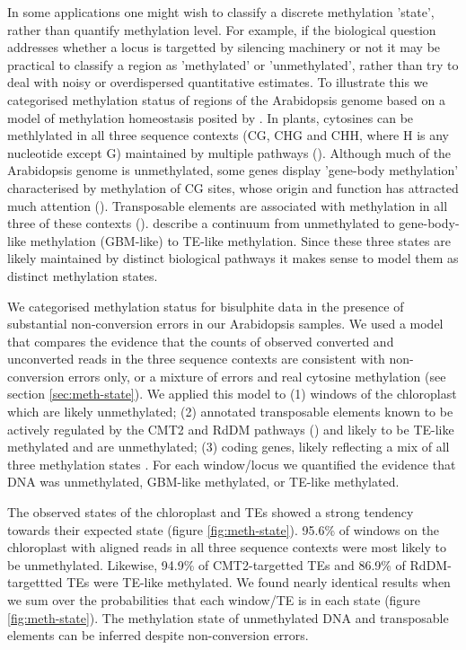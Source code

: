 \documentclass[twocolumn,twoside,lettersize]{article}
\begin{document}
In some applications one might wish to classify a discrete methylation 'state', rather than quantify methylation level.
For example, if the biological question addresses whether a locus is targetted by silencing machinery or not it may be practical to classify a region as 'methylated' or 'unmethylated', rather than try to deal with noisy or overdispersed quantitative estimates.
To illustrate this we categorised methylation status of regions of the Arabidopsis genome based on a model of methylation homeostasis posited by \textcite{zhang2020natural}.
In plants, cytosines can be methlylated in all three sequence contexts (CG, CHG and CHH, where H is any nucleotide except G) maintained by multiple pathways (\cite{law2010establishing}).
Although much of the Arabidopsis genome is unmethylated, some genes display 'gene-body methylation' characterised by methylation of CG sites, whose origin and function has attracted much attention (\cite{muyle2022gene}). 
Transposable elements are associated with methylation in all three of these contexts (\cite{cokus2008shotgun, lister2008highly}).
\textcite{zhang2020natural} describe a continuum from unmethylated to gene-body-like methylation (GBM-like) to TE-like methylation.
Since these three states are likely maintained by distinct biological pathways it makes sense to model them as distinct methylation states.

We categorised methylation status for bisulphite data in the presence of substantial non-conversion errors in our Arabidopsis samples.
We used a model that compares the evidence that the counts of observed converted and unconverted reads in the three sequence contexts are consistent with non-conversion errors only, or a mixture of errors and real cytosine methylation (see section \ref{sec:meth-state}).
We applied this model to (1) windows of the chloroplast which are likely unmethylated; (2) annotated transposable elements known to be actively regulated by the CMT2 and RdDM pathways (\cite{stroud2013comprehensive}) and likely to be TE-like methylated and are unmethylated; (3) coding genes, likely reflecting a mix of all three methylation states \parencite{zhang2020natural}.
For each window/locus we quantified the evidence that DNA was unmethylated, GBM-like methylated, or TE-like methylated.

The observed states of the chloroplast and TEs showed a strong tendency towards their expected state (figure \ref{fig:meth-state}).
95.6\% of windows on the chloroplast with aligned reads in all three sequence contexts were most likely to be unmethylated.
Likewise, 94.9\% of CMT2-targetted TEs and 86.9\% of RdDM-targettted TEs were TE-like methylated.
We found nearly identical results when we sum over the probabilities that each window/TE is in each state (figure \ref{fig:meth-state}).
The methylation state of unmethylated DNA and transposable elements can be inferred despite non-conversion errors.
\end{document}
